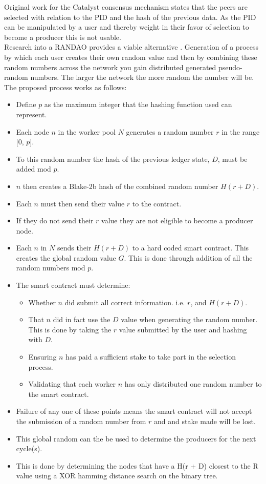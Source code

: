 Original work for the Catalyst consensus mechanism states that the peers are selected with relation to the PID and the hash of the previous data. As the PID can be manipulated by a user and thereby weight in their favor of selection to become a producer this is not usable. \\

Research into a RANDAO provides a viable alternative \cite{skvorc}\cite{randao}. Generation of a process by which each user creates their own random value and then by combining these random numbers across the network you gain distributed generated pseudo-random numbers. The larger the network the more random the number will be. The proposed process works as follows: \\

\begin{itemize}

\item Define $p$ as the maximum integer that the hashing function used can represent.
\item Each node $n$ in the worker pool $N$ generates a random number $r$ in the range [0, $p$].
\item To this random number the hash of the previous ledger state, $D$, must be added mod $p$.
\item $n$ then creates a Blake-2b hash of the combined random number $H(r + D)$.
\item Each $n$ must then send their value $r$ to the contract.
\item If they do not send their $r$ value they are not eligible to become a producer node.
\item Each $n$ in $N$ sends their $H(r + D)$ to a hard coded smart contract. This creates the global random value $G$. This is done through addition of all the random numbers mod $p$.
\item The smart contract must determine:
\begin{itemize}
\item Whether $n$ did submit all correct information. i.e. $r$, and $H(r+D)$.
\item That $n$ did in fact use the $D$ value when generating the random number. This is done by taking the $r$ value submitted by the user and hashing with $D$.
\item Ensuring $n$ has paid a sufficient stake to take part in the selection process.
\item Validating that each worker $n$ has only distributed one random number to the smart contract.
\end{itemize}
\item Failure of any one of these points means the smart contract will not accept the submission of a random number from $r$ and and stake made will be lost.
\item This global random can the be used to determine the producers for the next cycle(s).
\item This is done by determining the nodes that have a H(r + D) closest to the R value using a XOR hamming distance search on the binary tree.\\

\end{itemize}

